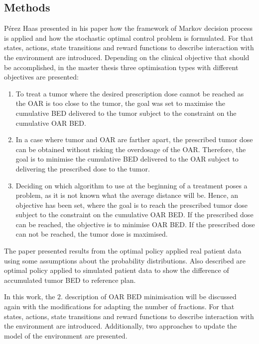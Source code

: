 \documentclass[\relativeRoot/ada.tex]{subfiles}
\begin{document}
\subsection{Methods}

Pérez Haas \cite{perezhaas_adaptive} presented in his paper how the framework of Markov decision process is applied and how the stochastic optimal control problem is formulated. For that states, actions, state transitions and reward functions to describe interaction with the environment are introduced. Depending on the clinical objective that should be accomplished, in the master thesis \cite{perezhaas_master} three optimisation types with different objectives are presented:
\begin{enumerate}
    \item To treat a tumor where the desired prescription dose cannot be reached as the OAR is too close to the tumor, the goal was set to maximise the cumulative BED delivered to the tumor subject to the constraint on the cumulative OAR BED.
    \item In a case where tumor and OAR are farther apart, the prescribed tumor dose can be obtained without risking the overdosage of the OAR. Therefore, the goal is to minimise the cumulative BED delivered to the OAR subject to delivering the prescribed dose to the tumor.
    \item Deciding on which algorithm to use at the beginning of a treatment poses a problem, as it is not known what the average distance will be. Hence, an objective has been set, where the goal is to reach the prescribed tumor dose subject to the constraint on the cumulative OAR BED. If the prescribed dose can be reached, the objective is to minimise OAR BED. If the prescribed dose can not be reached, the tumor dose is maximised.
\end{enumerate}

The paper presented results from the optimal policy applied real patient data using some assumptions about the probability distributions. Also described are optimal policy applied to simulated patient data to show the difference of accumulated tumor BED to reference plan.

In this work, the $2.$ description of OAR BED minimisation will be discussed again with the modifications for adapting the number of fractions. For that states, actions, state transitions and reward functions to describe interaction with the environment are introduced. Additionally, two approaches to update the model of the environment are presented.
\end{document}
